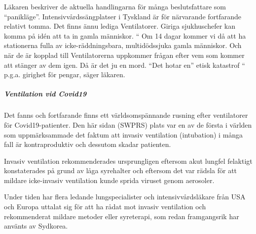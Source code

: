 Läkaren beskriver de aktuella handlingarna för många beslutsfattare som
``panikläge''. Intensivvårdssängplatser i Tyskland är för närvarande
fortfarande relativt tomma. Det finns ännu lediga Ventilatorer. Giriga
sjukhuschefer kan komma på idén att ta in gamla människor. `` Om 14
dagar kommer vi då att ha stationerna fulla av icke-räddningsbara,
multidödssjuka gamla människor. Och när de är kopplad till
Ventilatorerna uppkommer frågan efter vem som kommer att stänger av dem
igen. Då är det ju en mord. ``Det hotar en'' etisk katastrof `` p.g.a.
girighet för pengar, säger läkaren.

\hypertarget{ventilation-vid-covid19}{%
\subparagraph{\texorpdfstring{\textbf{Ventilation vid
Covid19}}{Ventilation vid Covid19}}\label{ventilation-vid-covid19}}

Det fanns och fortfarande finns ett världsomspännande rusning efter
ventilatorer för Covid19-patienter. Den här sidan (SWPRS) plats var en
av de första i världen som uppmärksammade det faktum att invasiv
ventilation (intubation) i många fall är kontraproduktiv och dessutom
skadar patienten.

Invasiv ventilation rekommenderades ursprungligen eftersom akut lungfel
felaktigt konstaterades på grund av låga syrehalter och eftersom det var
rädsla för att mildare icke-invasiv ventilation kunde sprida viruset
genom aerosoler.

Under tiden har flera ledande lungspecialister och intensivvårdsläkare
från USA och Europa uttalat sig för att ha rådat mot invasiv ventilation
och rekommenderat mildare metoder eller syreterapi, som redan
framgangsrik har använts av Sydkorea.

